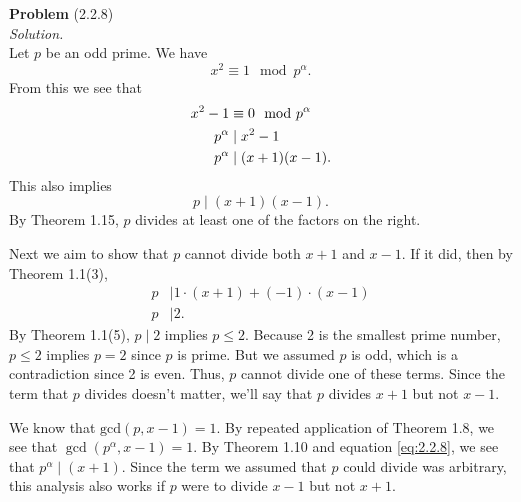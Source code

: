 \documentclass[12 pt]{amsart}
\begin{document}
\phantom{\quad} \vfill
\noindent
\textbf{Problem} (2.2.8) \\[4ex]
\emph{Solution.} \\[2ex]
   Let $p$ be an odd prime.
   We have
   \[
     x^2 \equiv 1 \mod p^{\alpha}.
   \]
   From this we see that 
   \begin{align}
     x^2 - 1 &\equiv 0 \mod p^{\alpha} \notag \\
     p^{\alpha} &\mid x^2 - 1 \notag \\
     p^{\alpha} &\mid (x+1)(x-1).\label{eq:2.2.8}
   \end{align}
   This also implies
   \[
     p \mid (x+1)(x-1).
   \]
   By Theorem 1.15, $p$ divides at least one of the
   factors on the right.

   Next we aim to show that $p$ cannot divide both 
   $x+1$ and $x-1$. 
   If it did, then by Theorem 1.1(3), 
   \begin{align*}
     p &\mid 1 \cdot (x + 1) + (-1)\cdot (x - 1) \\
     p &\mid 2.
   \end{align*}
   By Theorem 1.1(5), $p \mid 2$ implies $p \leq 2$. 
   Because 2 is the smallest prime number, $p \leq 2$ implies
   $p = 2$ since $p$ is prime. 
   But we assumed $p$ is odd, which is a contradiction
   since 2 is even.
   Thus, $p$ cannot divide one of these terms.
   Since the term that $p$ divides doesn't matter, we'll
   say that $p$ divides $x + 1$ but not $x - 1$.

   We know that $\text{gcd}(p, x-1) = 1$.
   By repeated application of Theorem 1.8, we see that
   $\gcd(p^{\alpha},x-1) = 1$.
   By Theorem 1.10 and equation \ref{eq:2.2.8}, 
   we see that $p^{\alpha} \mid (x+1)$.
   Since the term we assumed that $p$ could divide was arbitrary,
   this analysis also works if $p$ were to divide 
   $x -1$ but not $x + 1$.
\vfill
\newpage
\end{document}
